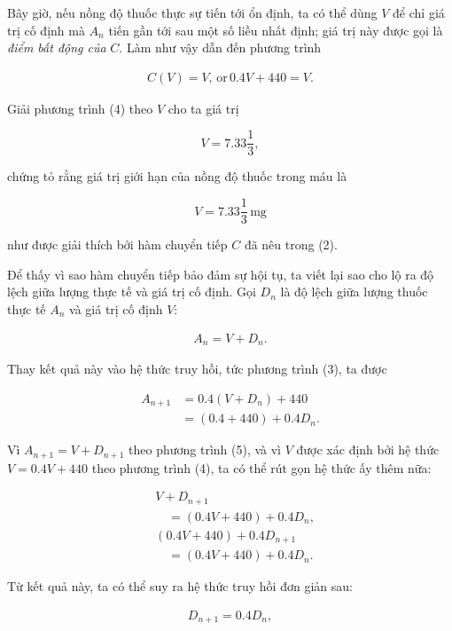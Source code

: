 \documentclass[
  10pt,
  a4paper,
  landscape,
  twoside,
  openany
]{scrbook}
\begin{document}
{\begin{description}
  Bây giờ, nếu nồng độ thuốc thực sự tiến tới ổn định, ta có thể dùng $V$ để chỉ giá trị cố định mà $A_n$ tiến gần tới sau một số liều nhất định; giá trị này được gọi là \emph{điểm bất động của} $C$. Làm như vậy dẫn đến phương trình

  \begin{align*}
    C(V)=V, \, \text{or} \, 0.4V+440=V. \tag{4}
  \end{align*}

  Giải phương trình (4) theo $V$ cho ta giá trị 

  $$
    V=7.33\frac{1}{3},
  $$

  chứng tỏ rằng giá trị giới hạn của nồng độ thuốc trong máu là

  $$
    V=7.33\frac{1}{3} \, \text{mg}
  $$

  như được giải thích bởi hàm chuyển tiếp $C$ đã nêu trong (2).

  Để thấy vì sao hàm chuyển tiếp bảo đảm sự hội tụ, ta viết lại sao cho lộ ra độ lệch giữa lượng thực tế và giá trị cố định. Gọi $D_n$ là độ lệch giữa lượng thuốc thực tế $A_n$ và giá trị cố định $V$:

  \begin{align*}
      A_n=V+D_n. \tag{5}
  \end{align*}

  Thay kết quả này vào hệ thức truy hồi, tức phương trình (3), ta được

  \begin{align*}
    A_{n+1}
      &=0.4(V+D_n)+440\\
      &=(0.4+440)+0.4D_n. \tag{6}
  \end{align*} 

  Vì $A_{n+1}=V+D_{n+1}$ theo phương trình (5), và vì $V$ được xác định bởi hệ thức $V=0.4V+440$ theo phương trình (4), ta có thể rút gọn hệ thức ấy thêm nữa:

  \begin{align*}
    &V+D_{n+1} \\
    &\quad =(0.4V+440)+0.4D_n, \\
    & (0.4V+440)+0.4D_{n+1} \\
    &\quad =(0.4V+440)+0.4D_n.  
  \end{align*}

  Từ kết quả này, ta có thể suy ra hệ thức truy hồi đơn giản sau:

  \begin{align*}
      D_{n+1}=0.4D_n, \tag{7}
  \end{align*}
  

\end{description}}
\end{document}
